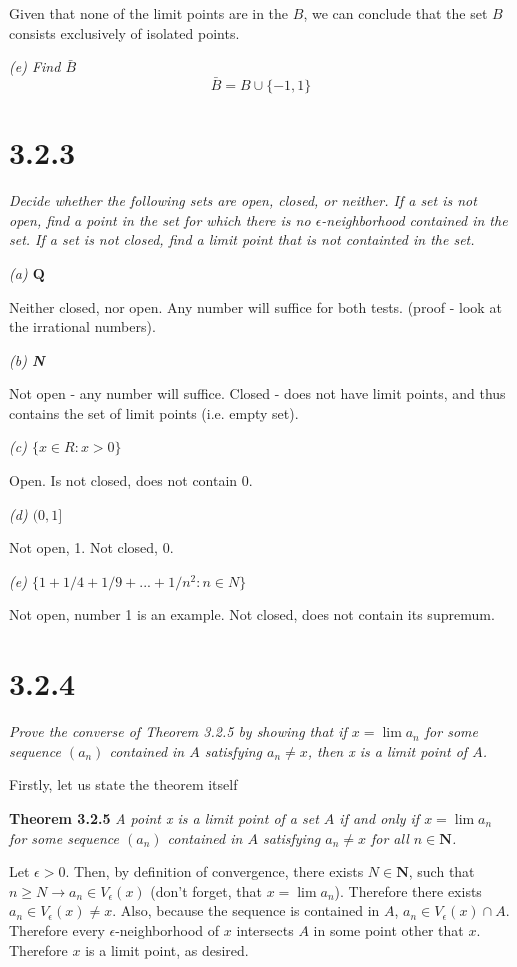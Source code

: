 \documentclass[11pt,oneside,titlepage]{article}
\begin{document}
Given that none of the limit points are in the $B$, we can conclude that
the set $B$ consists exclusively of isolated points.

\textit{(e) Find $\bar{B}$}
$$\bar{B} = B \cup \{-1, 1\}$$

\section*{3.2.3}
\textit{Decide whether the following sets are open, closed, or neither. If a
  set is not open, find a point in the set for which there is no
  $\epsilon$-neighborhood contained in the set. If a set is not closed, find
  a limit point that is not containted in the set.  }

\textit{(a) $\textbf{Q}$}

Neither closed, nor open. Any number will suffice for both tests.
(proof - look at the irrational numbers).

\textit{(b) \textbf{N}}

Not open - any number will suffice. Closed - does not have limit points, and
thus contains the set of limit points (i.e. empty set).

\textit{(c) $\{x \in R: x > 0\}$}

Open. Is not closed, does not contain 0.

\textit{(d) $(0,1]$}

Not open, 1. Not closed, 0.

\textit{(e) $\{1 + 1/4 + 1/9 + ... + 1/n^2: n \in N\}$}

Not open, number 1 is an example. Not closed, does not contain its supremum.


\section*{3.2.4}
\textit{Prove the converse of Theorem 3.2.5 by showing that if
  $x = \lim a_n$ for some sequence $(a_n)$ contained in $A$ satisfying
  $a_n \neq x$, then x is a limit point of $A$.}

Firstly, let us state the theorem itself

\textbf{Theorem 3.2.5}
\textit{A point x is a limit point of a set $A$ if and only if $x = \lim a_n$
  for some sequence $(a_n)$ contained in $A$ satisfying $a_n \neq x$ for all
  $n \in \textbf{N}$.}

Let  $\epsilon > 0$. Then, by definition of convergence, there
exists $N \in \textbf{N}$, such that $n \geq N \to a_n \in V_\epsilon(x)$
(don't forget, that $x = \lim a_n$). Therefore there exists
$a_n \in V_\epsilon(x) \neq x $. Also, because the sequence is contained in
$A$, $a_n \in V_\epsilon(x) \cap A$.  Therefore every $\epsilon$-neighborhood
of $x$ intersects  $A$ in some point other that $x$. Therefore $x$ is a limit
point, as desired.
\end{document}
